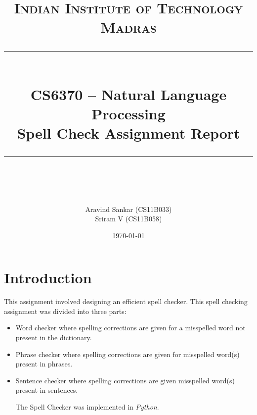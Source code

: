 \newcommand{\horrule}[1]{\rule{\linewidth}{#1}} %

\title{	
\normalfont \normalsize 
\textsc{Indian Institute of Technology Madras} \\ [25pt] %
\horrule{0.5pt} \\[0.4cm] %
\huge CS6370 -- Natural Language Processing \\ Spell Check Assignment Report \\ %
\horrule{2pt} \\[0.5cm] %
}
\author{\large Aravind Sankar (CS11B033) \\ \large Sriram V (CS11B058)} %

\date{\normalsize\today} %



\maketitle

\section{Introduction}
This assignment involved designing an efficient spell checker. This spell checking assignment was divided into three parts: 
\begin{itemize}
\item Word checker where spelling corrections are given for a misspelled word not present in the dictionary.
\item Phrase checker where spelling corrections are given for misspelled word(s) present in phrases.
\item Sentence checker where spelling corrections are given misspelled word(s) present in sentences.

The Spell Checker was implemented in \textit{Python}.
\end{itemize}

